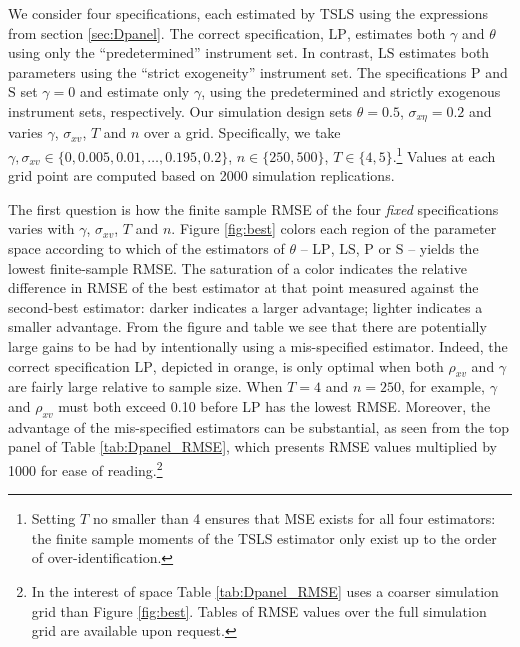 We consider four specifications, each estimated by TSLS using the expressions from section \ref{sec:Dpanel}.
The correct specification, $\text{LP}$, estimates both $\gamma$ and $\theta$ using only the ``predetermined'' instrument set.
In contrast, $\text{LS}$ estimates both parameters using the ``strict exogeneity'' instrument set.
The specifications $\text{P}$ and $\text{S}$ set $\gamma=0$ and estimate only $\gamma$, using the predetermined and strictly exogenous instrument sets, respectively.
Our simulation design sets $\theta = 0.5$, $\sigma_{x\eta}=0.2$ and varies  $\gamma$, $\sigma_{xv}$, $T$ and $n$ over a grid.
Specifically, we take $\gamma, \sigma_{xv} \in \{0, 0.005, 0.01, \hdots, 0.195, 0.2\}$, $n \in \{250,500\}$, $T \in \{4,5\}$.\footnote{Setting $T$ no smaller than 4 ensures that MSE exists for all four estimators: the finite sample moments of the TSLS estimator only exist up to the order of over-identification.}
Values at each grid point are computed based on 2000 simulation replications.

The first question is how the finite sample RMSE of the four \emph{fixed} specifications varies with $\gamma$, $\sigma_{xv}$, $T$ and $n$.
Figure \ref{fig:best} colors each region of the parameter space according to which of the estimators of $\theta$ -- $\text{LP}$, $\text{LS}$, $\text{P}$ or $\text{S}$ -- yields the lowest finite-sample RMSE.
The saturation of a color indicates the relative difference in RMSE of the best estimator at that point measured against the second-best estimator: darker indicates a larger advantage; lighter indicates a smaller advantage. 
From the figure and table we see that there are potentially large gains to be had by intentionally using a mis-specified estimator.
Indeed, the correct specification $\text{LP}$, depicted in orange, is only optimal when both $\rho_{xv}$ and $\gamma$ are fairly large relative to sample size.
When $T=4$ and $n=250$, for example, $\gamma$ and $\rho_{xv}$ must both exceed 0.10 before $\text{LP}$ has the lowest RMSE.
Moreover, the advantage of the mis-specified estimators can be substantial, as seen from the top panel of Table \ref{tab:Dpanel_RMSE}, which presents RMSE values multiplied by 1000 for ease of reading.\footnote{In the interest of space Table \ref{tab:Dpanel_RMSE} uses a coarser simulation grid than Figure \ref{fig:best}. Tables of RMSE values over the full simulation grid are available upon request.}

